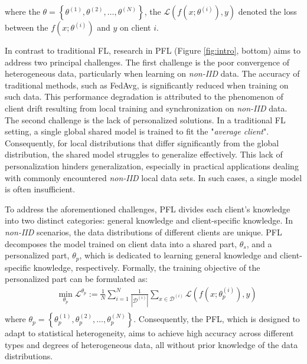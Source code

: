\documentclass[sigconf]{acmart}
\begin{document}
where the $\theta = \left\{\theta^{(1)}, \theta^{(2)}, \dots, \theta^{(N)} \right\}$, the $\mathcal{L}(f(x; \theta^{(i)}), y)$ denoted the loss between the $f(x; \theta^{(i)})$ and $y$ on client $i$. 
\par
In contrast to traditional FL, research in PFL (Figure \ref{fig:intro}, bottom) aims to address two principal challenges. The first challenge is the poor convergence of heterogeneous data, particularly when learning on \textit{non-IID} data. The accuracy of traditional methods, such as FedAvg, is significantly reduced when training on such data. This performance degradation is attributed to the phenomenon of client drift resulting from local training and synchronization on \textit{non-IID} data. The second challenge is the lack of personalized solutions. In a traditional FL setting, a single global shared model is trained to fit the "\textit{average client}". Consequently, for local distributions that differ significantly from the global distribution, the shared model struggles to generalize effectively. This lack of personalization hinders generalization, especially in practical applications dealing with commonly encountered \textit{non-IID} local data sets. In such cases, a single model is often insufficient.
\par
To address the aforementioned challenges, PFL divides each client's knowledge into two distinct categories: general knowledge and client-specific knowledge. In \textit{non-IID} scenarios, the data distributions of different clients are unique. PFL decomposes the model trained on client data into a shared part, $\theta_{s}$, and a personalized part, $\theta_p$, which is dedicated to learning general knowledge and client-specific knowledge, respectively. Formally, the training objective of the personalized part can be formulated as:
\begin{equation}
    \begin{array}{cc}
         &  \mathop{\min}\limits_{\theta_{p}} \mathcal{L}^{\theta_{p}} := \frac{1}{N} \sum\limits_{i=1}^{N} \frac{1}{|\mathcal{D}^{(i)}|} \sum\limits_{x \in \mathcal{D}^{(i)}} \mathcal{L} (f(x; \theta^{(i)}_{p}), y)  \\
    \end{array}
\end{equation}
where $\theta_{p} = \left\{\theta_{p}^{(1)}, \theta_{p}^{(2)}, \dots,\theta_{p}^{(N)} \right\}$. Consequently, the PFL, which is designed to adapt to statistical heterogeneity, aims to achieve high accuracy across different types and degrees of heterogeneous data, all without prior knowledge of the data distributions.
\end{document}
